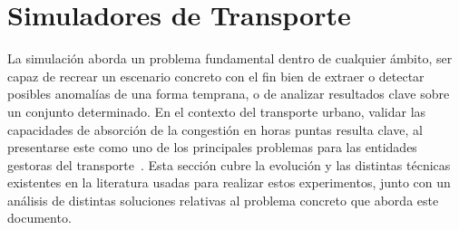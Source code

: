 \section{Simuladores de Transporte}
La simulación aborda un problema fundamental dentro de cualquier ámbito, ser capaz de recrear un escenario 
concreto con el fin bien de extraer o detectar posibles anomalías de una forma temprana, o de analizar resultados
clave sobre un conjunto determinado. En el contexto del 
transporte urbano, validar las capacidades de absorción de la congestión en horas puntas resulta clave,
al presentarse este como uno de los principales problemas para las entidades gestoras 
del transporte~\cite{saidallah2016comparative}. Esta sección cubre la evolución y las distintas 
técnicas existentes en la literatura usadas para realizar estos experimentos, junto con un análisis
de distintas soluciones relativas al problema concreto que aborda este documento. 

